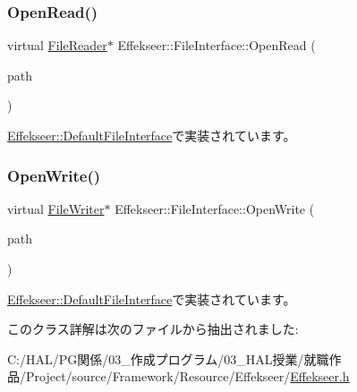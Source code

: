 \subsubsection{\texorpdfstring{Open\+Read()}{OpenRead()}}
{\footnotesize\ttfamily virtual \mbox{\hyperlink{class_effekseer_1_1_file_reader}{File\+Reader}}$\ast$ Effekseer\+::\+File\+Interface\+::\+Open\+Read (\begin{DoxyParamCaption}\item[{const \mbox{\hyperlink{_effekseer_8h_a50b026abea014b47854bcd835b3b6233}{E\+F\+K\+\_\+\+C\+H\+AR}} $\ast$}]{path }\end{DoxyParamCaption})\hspace{0.3cm}{\ttfamily [pure virtual]}}



\mbox{\hyperlink{class_effekseer_1_1_default_file_interface_a03d6224d1eb0124a21f42c578e447d51}{Effekseer\+::\+Default\+File\+Interface}}で実装されています。

\mbox{\label{class_effekseer_1_1_file_interface_a1e60cb81a5cae39b37e44570ef693d91}} 
\subsubsection{\texorpdfstring{Open\+Write()}{OpenWrite()}}
{\footnotesize\ttfamily virtual \mbox{\hyperlink{class_effekseer_1_1_file_writer}{File\+Writer}}$\ast$ Effekseer\+::\+File\+Interface\+::\+Open\+Write (\begin{DoxyParamCaption}\item[{const \mbox{\hyperlink{_effekseer_8h_a50b026abea014b47854bcd835b3b6233}{E\+F\+K\+\_\+\+C\+H\+AR}} $\ast$}]{path }\end{DoxyParamCaption})\hspace{0.3cm}{\ttfamily [pure virtual]}}



\mbox{\hyperlink{class_effekseer_1_1_default_file_interface_aecbcd4350ca701360dcea88a2c5f9c64}{Effekseer\+::\+Default\+File\+Interface}}で実装されています。



このクラス詳解は次のファイルから抽出されました\+:\begin{DoxyCompactItemize}
\item 
C\+:/\+H\+A\+L/\+P\+G関係/03\+\_\+作成プログラム/03\+\_\+\+H\+A\+L授業/就職作品/\+Project/source/\+Framework/\+Resource/\+Effekseer/\mbox{\hyperlink{_effekseer_8h}{Effekseer.\+h}}\end{DoxyCompactItemize}

